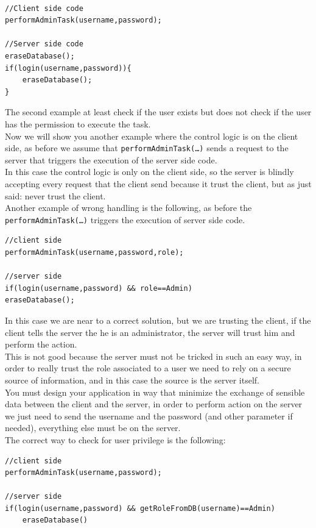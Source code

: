 \begin{lstlisting}

//Client side code
performAdminTask(username,password);

//Server side code
eraseDatabase();
if(login(username,password)){
	eraseDatabase();
}
\end{lstlisting}

The second example at least check if the user exists but does not check if the user has the permission to execute the task.\\
Now we will show you another example where the control logic is on the client side, as before we assume that \texttt{performAdminTask(…)} sends a request to the server that triggers the execution of the server side code.\\

In this case the control logic is only on the client side, so the server is blindly accepting every request that the client send because it trust the client, but as just said: never trust the client.\\
Another example of wrong handling is the following, as before the \texttt{performAdminTask(…)} triggers the execution of server side code.\\

\begin{lstlisting}
//client side
performAdminTask(username,password,role);

//server side
if(login(username,password) && role==Admin)
eraseDatabase();
\end{lstlisting}


In this case we are near to a correct solution, but we are trusting the client, if the client tells the server the he is an administrator, the server will trust him and perform the action.\\
This is not good because the server must not be tricked in such an easy way, in order to really trust the role associated to a user we need to rely on a secure source of information, and in this case the source is the server itself.\\
You must design your application in way that minimize the exchange of sensible data between the client and the server, in order to perform action on the server we just need to send the username and the password (and other parameter if needed), everything else must be on the server.\\
The correct way to check for user privilege is the following:

\begin{lstlisting}
//client side
performAdminTask(username,password);

//server side
if(login(username,password) && getRoleFromDB(username)==Admin)
	eraseDatabase()
\end{lstlisting}

